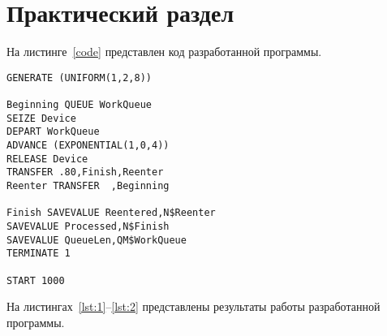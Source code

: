 \chapter{Практический раздел}

На листинге~\ref{code} представлен код разработанной программы.

\begin{lstlisting}[label=code,caption=Код разработанной программы]
GENERATE (UNIFORM(1,2,8))

Beginning QUEUE WorkQueue
SEIZE Device
DEPART WorkQueue
ADVANCE (EXPONENTIAL(1,0,4))
RELEASE Device
TRANSFER .80,Finish,Reenter
Reenter TRANSFER  ,Beginning

Finish SAVEVALUE Reentered,N$Reenter 
SAVEVALUE Processed,N$Finish
SAVEVALUE QueueLen,QM$WorkQueue
TERMINATE 1

START 1000
\end{lstlisting}

На листингах~\ref{lst:1}--\ref{lst:2} представлены результаты работы разработанной программы.

